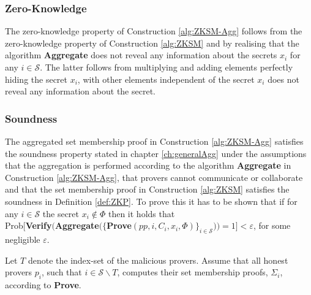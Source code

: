 
\subsubsection*{Zero-Knowledge}
The zero-knowledge property of Construction \ref{alg:ZKSM-Agg} follows from the zero-knowledge property of Construction \ref{alg:ZKSM} and by realising that the algorithm \textbf{Aggregate} does not reveal any information about the secrets $x_i$ for any $i\in\mathcal{S}$. The latter follows from multiplying and adding elements perfectly hiding the secret $x_i$, with other elements independent of the secret $x_i$ does not reveal any information about the secret. 

\subsubsection*{Soundness}
The aggregated set membership proof in Construction \ref{alg:ZKSM-Agg} satisfies the soundness property stated in chapter \ref{ch:generalAgg} under the assumptions that the aggregation is performed according to the algorithm \textbf{Aggregate} in Construction \ref{alg:ZKSM-Agg},  that provers cannot communicate or collaborate and that the set membership proof in Construction \ref{alg:ZKSM} satisfies the soundness in Definition \ref{def:ZKP}. To prove this it has to be shown that if for any $i\in\mathcal{S}$ the secret $x_i\notin\Phi$ then it holds that \\ Prob$[ $\textbf{Verify}$($\textbf{Aggregate}$(\{$\textbf{Prove}$(pp,i,C_i,x_i,\Phi)\}_{i\in\mathcal{S}}) ) = 1] < \varepsilon$, for some negligible $\varepsilon$.


Let $T$ denote the index-set of the malicious provers. Assume that all honest provers $p_i$, such that $i\in\mathcal{S}\backslash T$, computes their set membership proofs, $\Sigma_i$, according to \textbf{Prove}.



